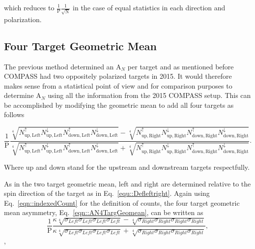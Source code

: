 \noindent
which reduces to $\frac{1}{\mathrm{P}}\frac{1}{\sqrt{\mathrm{N}}}$ in the case
of equal statistics in each direction and polarization.

\subsection{Four Target Geometric Mean} \label{sec::FourTargGeoMean}
The previous method determined an A$_N$ per target and as mentioned before
COMPASS had two oppositely polarized targets in 2015.  It would therefore makes
sense from a statistical point of view and for comparison purposes to determine
A$_N$ using all the information from the 2015 COMPASS setup.  This can be
accomplished by modifying the geometric mean to add all four targets as follows

\begin{equation}
  \label{eqn::AN4TargGeomean}
  \frac{1}{\mathrm{P}}
  \frac{
    \sqrt[4]{
      N_{\mathrm{up,Left}}^{\uparrow}N_{\mathrm{up, Left}}^{\downarrow}
      N_{\mathrm{down,Left}}^{\uparrow}N_{\mathrm{down, Left}}^{\downarrow}
    } -
    \sqrt[4]{
      N_{\mathrm{up,Right}}^{\uparrow}N_{\mathrm{up, Right}}^{\downarrow}
      N_{\mathrm{down,Right}}^{\uparrow}N_{\mathrm{down, Right}}^{\downarrow}
    }
  }{
    \sqrt[4]{
      N_{\mathrm{up,Left}}^{\uparrow}N_{\mathrm{up, Left}}^{\downarrow}
      N_{\mathrm{down,Left}}^{\uparrow}N_{\mathrm{down, Left}}^{\downarrow}
    } +
    \sqrt[4]{
      N_{\mathrm{up,Right}}^{\uparrow}N_{\mathrm{up, Right}}^{\downarrow}
      N_{\mathrm{down,Right}}^{\uparrow}N_{\mathrm{down, Right}}^{\downarrow}
    }
  }.
\end{equation}

\noindent
Where up and down stand for the upstream and downstream targets respectfully.

As in the two target geometric mean, left and right are determined relative to
the spin direction of the target as in Eq.~\ref{equ::Defleftright}.  Again using
Eq.~\ref{eqn::indexedCount} for the definition of counts, the four target
geometric mean asymmetry, Eq.~\ref{eqn::AN4TargGeomean}, can be written as
\begin{equation}
  \frac{1}{\mathrm{P}}
  \frac{
    \kappa \sqrt[4]{\sigma_{Left}\sigma_{Left}\sigma_{Left}\sigma_{Left}} -
    \sqrt[4]{\sigma_{Right}\sigma_{Right}\sigma_{Right}\sigma_{Right}}
  }{
    \kappa \sqrt[4]{\sigma_{Left}\sigma_{Left}\sigma_{Left}\sigma_{Left}} +
    \sqrt[4]{\sigma_{Right}\sigma_{Right}\sigma_{Right}\sigma_{Right}}
  },
\end{equation},

